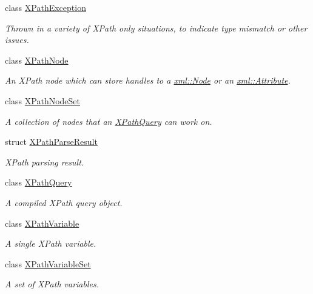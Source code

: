 \begin{DoxyCompactItemize}
class \hyperlink{classphys_1_1xml_1_1XPathException}{XPathException}
\begin{DoxyCompactList}\small\item\em Thrown in a variety of XPath only situations, to indicate type mismatch or other issues. \item\end{DoxyCompactList}\item 
class \hyperlink{classphys_1_1xml_1_1XPathNode}{XPathNode}
\begin{DoxyCompactList}\small\item\em An XPath node which can store handles to a \hyperlink{classphys_1_1xml_1_1Node}{xml::Node} or an \hyperlink{classphys_1_1xml_1_1Attribute}{xml::Attribute}. \item\end{DoxyCompactList}\item 
class \hyperlink{classphys_1_1xml_1_1XPathNodeSet}{XPathNodeSet}
\begin{DoxyCompactList}\small\item\em A collection of nodes that an \hyperlink{classphys_1_1xml_1_1XPathQuery}{XPathQuery} can work on. \item\end{DoxyCompactList}\item 
struct \hyperlink{structphys_1_1xml_1_1XPathParseResult}{XPathParseResult}
\begin{DoxyCompactList}\small\item\em XPath parsing result. \item\end{DoxyCompactList}\item 
class \hyperlink{classphys_1_1xml_1_1XPathQuery}{XPathQuery}
\begin{DoxyCompactList}\small\item\em A compiled XPath query object. \item\end{DoxyCompactList}\item 
class \hyperlink{classphys_1_1xml_1_1XPathVariable}{XPathVariable}
\begin{DoxyCompactList}\small\item\em A single XPath variable. \item\end{DoxyCompactList}\item 
class \hyperlink{classphys_1_1xml_1_1XPathVariableSet}{XPathVariableSet}
\begin{DoxyCompactList}\small\item\em A set of XPath variables. \item\end{DoxyCompactList}\end{DoxyCompactItemize}

